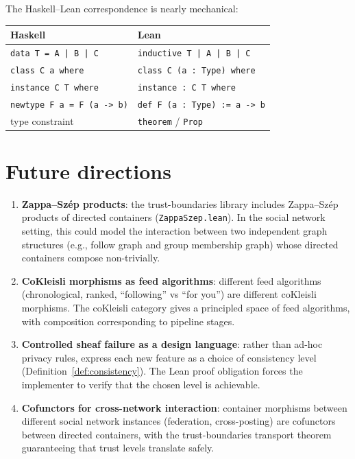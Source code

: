 \documentclass[11pt,a4paper]{article}
\theoremstyle{definition}
\theoremstyle{plain}
\theoremstyle{remark}
\begin{document}
The Haskell--Lean correspondence is nearly mechanical:

\begin{center}
\begin{tabular}{@{}ll@{}}
\toprule
\textbf{Haskell} & \textbf{Lean} \\
\midrule
\texttt{data T = A | B | C} & \texttt{inductive T | A | B | C} \\
\texttt{class C a where} & \texttt{class C (a : Type) where} \\
\texttt{instance C T where} & \texttt{instance : C T where} \\
\texttt{newtype F a = F (a -> b)} & \texttt{def F (a : Type) := a -> b} \\
type constraint & \texttt{theorem} / \texttt{Prop} \\
\bottomrule
\end{tabular}
\end{center}

\section{Future directions}
\label{sec:future}

\begin{enumerate}
  \item \textbf{Zappa--Sz\'ep products}: the trust-boundaries library
    includes Zappa--Sz\'ep products of directed containers
    (\texttt{ZappaSzep.lean}). In the social network setting, this
    could model the interaction between two independent graph
    structures (e.g., follow graph and group membership graph) whose
    directed containers compose non-trivially.

  \item \textbf{CoKleisli morphisms as feed algorithms}: different feed
    algorithms (chronological, ranked, ``following'' vs ``for you'')
    are different coKleisli morphisms. The coKleisli category gives a
    principled space of feed algorithms, with composition corresponding
    to pipeline stages.

  \item \textbf{Controlled sheaf failure as a design language}: rather
    than ad-hoc privacy rules, express each new feature as a choice of
    consistency level (Definition~\ref{def:consistency}). The Lean
    proof obligation forces the implementer to verify that the chosen
    level is achievable.

  \item \textbf{Cofunctors for cross-network interaction}: container
    morphisms between different social network instances
    (federation, cross-posting) are cofunctors between directed
    containers, with the trust-boundaries transport theorem
    guaranteeing that trust levels translate safely.
\end{enumerate}
\end{document}

